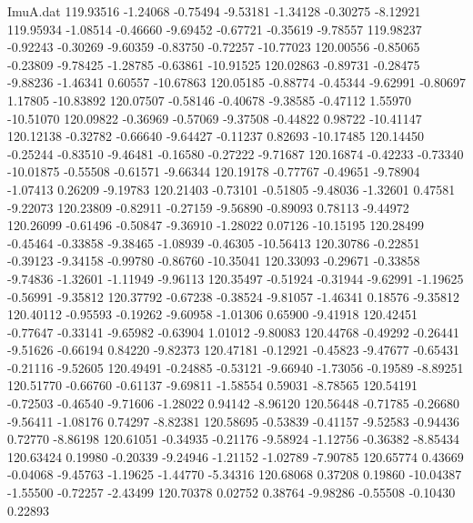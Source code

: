 \begin{filecontents}{ImuA.dat}
 119.93516   -1.24068   -0.75494   -9.53181   -1.34128   -0.30275   -8.12921
 119.95934   -1.08514   -0.46660   -9.69452   -0.67721   -0.35619   -9.78557
 119.98237   -0.92243   -0.30269   -9.60359   -0.83750   -0.72257  -10.77023
 120.00556   -0.85065   -0.23809   -9.78425   -1.28785   -0.63861  -10.91525
 120.02863   -0.89731   -0.28475   -9.88236   -1.46341    0.60557  -10.67863
 120.05185   -0.88774   -0.45344   -9.62991   -0.80697    1.17805  -10.83892
 120.07507   -0.58146   -0.40678   -9.38585   -0.47112    1.55970  -10.51070
 120.09822   -0.36969   -0.57069   -9.37508   -0.44822    0.98722  -10.41147
 120.12138   -0.32782   -0.66640   -9.64427   -0.11237    0.82693  -10.17485
 120.14450   -0.25244   -0.83510   -9.46481   -0.16580   -0.27222   -9.71687
 120.16874   -0.42233   -0.73340  -10.01875   -0.55508   -0.61571   -9.66344
 120.19178   -0.77767   -0.49651   -9.78904   -1.07413    0.26209   -9.19783
 120.21403   -0.73101   -0.51805   -9.48036   -1.32601    0.47581   -9.22073
 120.23809   -0.82911   -0.27159   -9.56890   -0.89093    0.78113   -9.44972
 120.26099   -0.61496   -0.50847   -9.36910   -1.28022    0.07126  -10.15195
 120.28499   -0.45464   -0.33858   -9.38465   -1.08939   -0.46305  -10.56413
 120.30786   -0.22851   -0.39123   -9.34158   -0.99780   -0.86760  -10.35041
 120.33093   -0.29671   -0.33858   -9.74836   -1.32601   -1.11949   -9.96113
 120.35497   -0.51924   -0.31944   -9.62991   -1.19625   -0.56991   -9.35812
 120.37792   -0.67238   -0.38524   -9.81057   -1.46341    0.18576   -9.35812
 120.40112   -0.95593   -0.19262   -9.60958   -1.01306    0.65900   -9.41918
 120.42451   -0.77647   -0.33141   -9.65982   -0.63904    1.01012   -9.80083
 120.44768   -0.49292   -0.26441   -9.51626   -0.66194    0.84220   -9.82373
 120.47181   -0.12921   -0.45823   -9.47677   -0.65431   -0.21116   -9.52605
 120.49491   -0.24885   -0.53121   -9.66940   -1.73056   -0.19589   -8.89251
 120.51770   -0.66760   -0.61137   -9.69811   -1.58554    0.59031   -8.78565
 120.54191   -0.72503   -0.46540   -9.71606   -1.28022    0.94142   -8.96120
 120.56448   -0.71785   -0.26680   -9.56411   -1.08176    0.74297   -8.82381
 120.58695   -0.53839   -0.41157   -9.52583   -0.94436    0.72770   -8.86198
 120.61051   -0.34935   -0.21176   -9.58924   -1.12756   -0.36382   -8.85434
 120.63424    0.19980   -0.20339   -9.24946   -1.21152   -1.02789   -7.90785
 120.65774    0.43669   -0.04068   -9.45763   -1.19625   -1.44770   -5.34316
 120.68068    0.37208    0.19860  -10.04387   -1.55500   -0.72257   -2.43499
 120.70378    0.02752    0.38764   -9.98286   -0.55508   -0.10430    0.22893

\end{filecontents}
